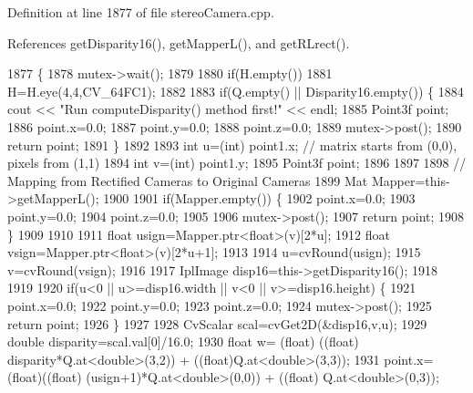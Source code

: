 Definition at line 1877 of file stereo\+Camera.\+cpp.



References get\+Disparity16(), get\+Mapper\+L(), and get\+R\+Lrect().


\begin{DoxyCode}
1877                                                                                   \{
1878     mutex->wait();
1879 
1880     \textcolor{keywordflow}{if}(H.empty())
1881         H=H.eye(4,4,CV\_64FC1);
1882 
1883     \textcolor{keywordflow}{if}(Q.empty() || Disparity16.empty()) \{
1884         cout << \textcolor{stringliteral}{"Run computeDisparity() method first!"} << endl;
1885         Point3f point;
1886         point.x=0.0;
1887         point.y=0.0;
1888         point.z=0.0;
1889         mutex->post();
1890         \textcolor{keywordflow}{return} point;
1891     \}
1892 
1893     \textcolor{keywordtype}{int} u=(int) point1.x; \textcolor{comment}{// matrix starts from (0,0), pixels from (1,1)}
1894     \textcolor{keywordtype}{int} v=(\textcolor{keywordtype}{int}) point1.y;
1895     Point3f point;
1896 
1897 
1898     \textcolor{comment}{// Mapping from Rectified Cameras to Original Cameras}
1899     Mat Mapper=this->getMapperL();
1900 
1901     \textcolor{keywordflow}{if}(Mapper.empty()) \{
1902         point.x=0.0;
1903         point.y=0.0;
1904         point.z=0.0;
1905         
1906         mutex->post();
1907         \textcolor{keywordflow}{return} point;
1908     \}
1909 
1910 
1911     \textcolor{keywordtype}{float} usign=Mapper.ptr<\textcolor{keywordtype}{float}>(v)[2*u];
1912     \textcolor{keywordtype}{float} vsign=Mapper.ptr<\textcolor{keywordtype}{float}>(v)[2*u+1]; 
1913 
1914     u=cvRound(usign);
1915     v=cvRound(vsign);
1916 
1917     IplImage disp16=this->getDisparity16();
1918     
1919 
1920     \textcolor{keywordflow}{if}(u<0 || u>=disp16.width || v<0 || v>=disp16.height) \{
1921         point.x=0.0;
1922         point.y=0.0;
1923         point.z=0.0;
1924         mutex->post();
1925         \textcolor{keywordflow}{return} point;
1926     \}
1927 
1928     CvScalar scal=cvGet2D(&disp16,v,u);
1929     \textcolor{keywordtype}{double} disparity=scal.val[0]/16.0;
1930     \textcolor{keywordtype}{float} w= (float) ((\textcolor{keywordtype}{float}) disparity*Q.at<\textcolor{keywordtype}{double}>(3,2)) + ((float)Q.at<\textcolor{keywordtype}{double}>(3,3));
1931     point.x= (float)((\textcolor{keywordtype}{float}) (usign+1)*Q.at<\textcolor{keywordtype}{double}>(0,0)) + ((\textcolor{keywordtype}{float}) Q.at<\textcolor{keywordtype}{double}>(0,3));

\end{DoxyCode}
